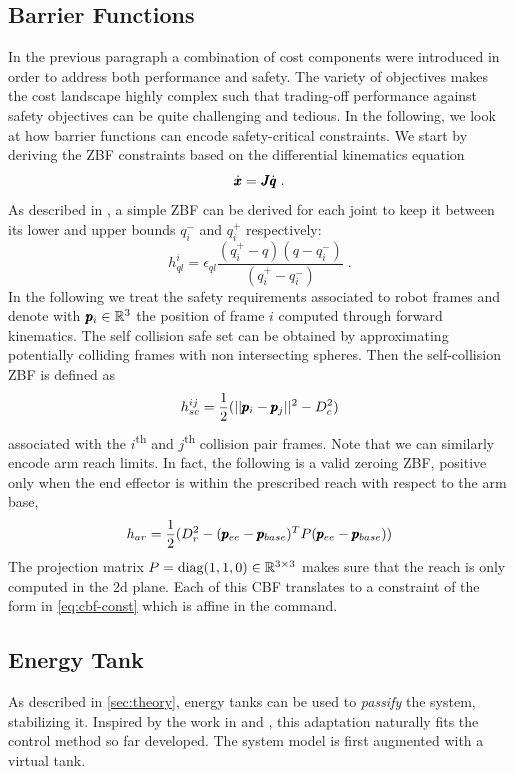 \subsection{Barrier Functions}
In the previous paragraph a combination of cost components were introduced in order to address both performance and safety. The variety of objectives makes the cost landscape highly complex such that trading-off performance against safety objectives can be quite challenging and tedious. In the following, we look at how barrier functions can encode safety-critical constraints. We start by deriving the ZBF constraints based on the differential kinematics equation
\begin{equation}
    \dot{\pmb{x}} = \pmb{J} \dot{\pmb{q}}\;.
\end{equation}
As described in \cite{benzi2021optimization}, a simple ZBF can be derived for each joint to keep it between its lower and upper bounds $q_i^-$ and $q_i^+$ respectively:
\begin{equation}
h_{ql}^i = \epsilon_{ql} \frac{(q_i^+ - q)(q - q_i^-)}{(q_i^+ - q_i^-)}\;.
\end{equation}
In the following we treat the safety requirements associated to robot frames and denote with $\pmb{p}_{i} \in \mathbb{R}^{3}$ the position of frame $i$ computed through forward kinematics.  
The self collision safe set can be obtained by approximating potentially colliding frames with non intersecting spheres. Then the self-collision ZBF is defined as
\begin{equation}
    h_{sc}^{ij} = \frac{1}{2}(||\pmb{p}_i - \pmb{p}_j||^2 - D_c^2)
\end{equation}
associated with the $i$\textsuperscript{th}  and $j$\textsuperscript{th} collision pair frames. Note that we can similarly encode arm reach limits. In fact, the following is a valid zeroing ZBF, positive only when the end effector is within the prescribed reach with respect to the arm base,
\begin{equation}
    h_{ar} = \frac{1}{2}(D_r^2 - (\pmb{p}_{ee} - \pmb{p}_{base})^T P (\pmb{p}_{ee} - \pmb{p}_{base}) )
\end{equation}
The projection matrix $P = \text{diag}(1, 1, 0) \in \mathbb{R}^{3 \times 3}$ makes sure that the reach is only computed in the 2d plane. Each of this CBF translates to a constraint of the form in \eqn \ref{eq:cbf-const} which is affine in the command. 

\subsection{Energy Tank}
As described in \sect \ref{sec:theory}, energy tanks can be used to \emph{passify} the system, stabilizing it. Inspired by the work in \cite{benzi2021optimization} and \cite{shahriari2018valve}, this adaptation naturally fits the control method so far developed. The system model is first augmented with a virtual tank. 

